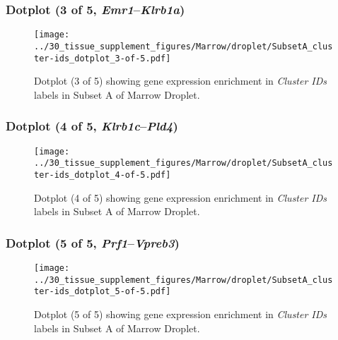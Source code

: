 \clearpage

\subsubsection{Dotplot (3 of 5, \emph{Emr1}--\emph{Klrb1a})}
\begin{figure}[h]
\centering
\texttt{[image: ../30\_tissue\_supplement\_figures/Marrow/droplet/SubsetA\_cluster-ids\_dotplot\_3-of-5.pdf]}

\caption{ Dotplot (3 of 5)  showing gene expression enrichment in \emph{Cluster IDs} labels in Subset A of Marrow Droplet. }
\end{figure}


\clearpage

\subsubsection{Dotplot (4 of 5, \emph{Klrb1c}--\emph{Pld4})}
\begin{figure}[h]
\centering
\texttt{[image: ../30\_tissue\_supplement\_figures/Marrow/droplet/SubsetA\_cluster-ids\_dotplot\_4-of-5.pdf]}

\caption{ Dotplot (4 of 5)  showing gene expression enrichment in \emph{Cluster IDs} labels in Subset A of Marrow Droplet. }
\end{figure}


\clearpage

\subsubsection{Dotplot (5 of 5, \emph{Prf1}--\emph{Vpreb3})}
\begin{figure}[h]
\centering
\texttt{[image: ../30\_tissue\_supplement\_figures/Marrow/droplet/SubsetA\_cluster-ids\_dotplot\_5-of-5.pdf]}

\caption{ Dotplot (5 of 5)  showing gene expression enrichment in \emph{Cluster IDs} labels in Subset A of Marrow Droplet. }
\end{figure}

